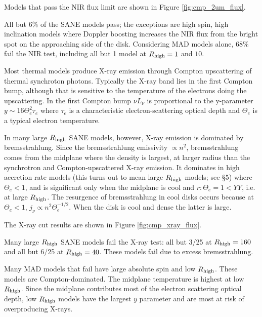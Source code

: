 Models that pass the NIR flux limit are shown in Figure \ref{fig:cmp_2um_flux}.

All but $6\%$ of the SANE models pass; the exceptions are high spin, high inclination models where Doppler boosting increases the NIR flux from the bright spot on the approaching side of the disk.  Considering MAD models alone, $68\%$ fail the NIR test, including all but 1 model at $R_\mathrm{high} = 1$ and $10$.



Most thermal models produce X-ray emission through Compton upscattering of thermal synchroton photons.  Typically the X-ray band lies in the first Compton bump, although that is sensitive to the temperature of the electrons doing the upscattering.  In the first Compton bump $\nu L_\nu$ is proportional to the y-parameter $y \sim 16 \Theta_e^2 \tau_e$ where $\tau_e$ is a characteristic electron-scattering optical depth and $\Theta_e$ is a typical electron temperature.

In many large $R_\mathrm{high}$ SANE models, however, X-ray emission is dominated by bremsstrahlung.  Since the bremsstrahlung emissivity $\propto n^2$, bremsstrahlung comes from the midplane where the density is largest, at larger radius than the synchrotron and Compton-upscattered X-ray emission.  It dominates in high accretion rate models (this turns out to mean large $R_\mathrm{high}$ models; see \S 5) where $\Theta_e < 1$, and is significant only when the midplane is cool and $r: \Theta_e = 1 < YY$, i.e. at large $R_\mathrm{high}$.  The resurgence of bremsstrahlung in cool disks occurs because at $\Theta_e < 1$, $j_\nu \propto n^2 \Theta_e^{-1/2}$.  When the disk is cool and dense the latter is large.

The X-ray cut results are shown in Figure \ref{fig:cmp_xray_flux}.

Many large $R_\mathrm{high}$ SANE models fail the X-ray test: all but 3/25 at $R_\mathrm{high} = 160$ and all but 6/25 at $R_\mathrm{high} = 40$.  These models fail due to excess bremsstrahlung.

Many MAD models that fail have large absolute spin and low $R_\mathrm{high}$.  These models are Compton-dominated.  The midplane temperature is highest at low $R_\mathrm{high}$.  Since the midplane contributes most of the electron scattering optical depth, low $R_\mathrm{high}$ models have the largest $y$ parameter and are most at risk of overproducing X-rays.


